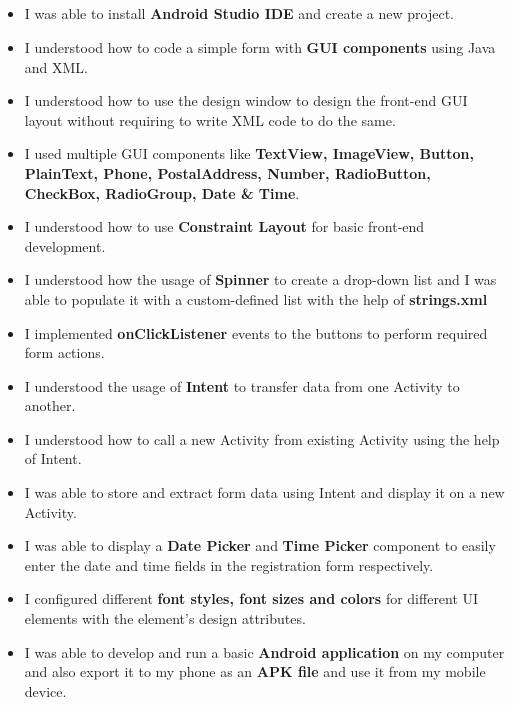 \documentclass[12pt, a4]{article}
\begin{document}
\subsection*{}
\begin{itemize}
\item I was able to install \textbf{Android Studio IDE} and create a new project.
\item I understood how to code a simple form with \textbf{GUI components} using Java and XML.
\item I understood how to use the design window to design the front-end GUI layout without requiring to write XML code to do the same.
\item I used multiple GUI components like \textbf{TextView, ImageView, Button, PlainText, Phone, PostalAddress, Number, RadioButton, CheckBox, RadioGroup, Date \& Time}.
\item I understood how to use \textbf{Constraint Layout} for basic front-end development.
\item I understood how the usage of \textbf{Spinner} to create a drop-down list and I was able to populate it with a custom-defined list with the help of \textbf{strings.xml}
\item I implemented \textbf{onClickListener} events to the buttons to perform required form actions.
\item I understood the usage of \textbf{Intent} to transfer data from one Activity to another.
\item I understood how to call a new Activity from existing Activity using the help of Intent.
\item I was able to store and extract form data using Intent and display it on a new Activity.
\item I was able to display a \textbf{Date Picker} and \textbf{Time Picker} component to easily enter the date and time fields in the registration form respectively.
\item I configured different \textbf{font styles, font sizes and colors} for different UI elements with the element's design attributes.
\item I was able to develop and run a basic \textbf{Android application} on my computer and also export it to my phone as an \textbf{APK file} and use it from my mobile device.
\end{itemize}
\end{document}
